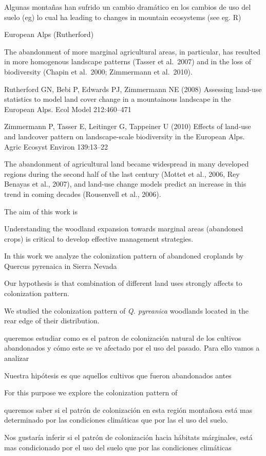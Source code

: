 \documentclass[
]{article}
\begin{document}
Algunas montañas han sufrido un cambio dramático en los cambios de uso
del suelo (eg) lo cual ha leading to changes in mountain ecosystems (see
eg. R)

European Alps (Rutherford)

The abandonment of more marginal agricultural areas, in particular, has
resulted in more homogenous landscape patterns (Tasser et al.~2007) and
in the loss of biodiversity (Chapin et al.~2000; Zimmermann et
al.~2010).

Rutherford GN, Bebi P, Edwards PJ, Zimmermann NE (2008) Assessing
land-use statistics to model land cover change in a mountainous
landscape in the European Alps. Ecol Model 212:460--471

Zimmermann P, Tasser E, Leitinger G, Tappeiner U (2010) Effects of
land-use and landcover pattern on landscape-scale biodiversity in the
European Alps. Agric Ecosyst Environ 139:13--22

The abandonment of agricultural land became widespread in many developed
regions during the second half of the last century (Mottet et al., 2006,
Rey Benayas et al., 2007), and land-use change models predict an
increase in this trend in coming decades (Rousenvell et al., 2006).

The aim of this work is

Understanding the woodland expansion towards marginal areas (abandoned
crops) is critical to develop effective management strategies.

In this work we analyze the colonization pattern of abandoned croplands
by Quercus pyrenaica in Sierra Nevada

Our hypothesis is that combination of different land uses strongly
affects to colonization pattern.

We studied the colonization pattern of \emph{Q. pyreanica} woodlands
located in the rear edge of their distribution.

queremos estudiar como es el patron de colonización natural de los
cultivos abandonados y cómo este se ve afectado por el uso del pasado.
Para ello vamos a analizar

Nuestra hipótesis es que aquellos cultivos que fueron abandonados antes

For this purpose we explore the colonization pattern of

queremos saber si el patrón de colonización en esta región montañosa
está mas determinado por las condiciones climáticas que por las el uso
del suelo.

Nos gustaría inferir si el patrón de colonización hacia hábitats
márginales, está mas condicionado por el uso del suelo que por las
condiciones climáticas
\end{document}
